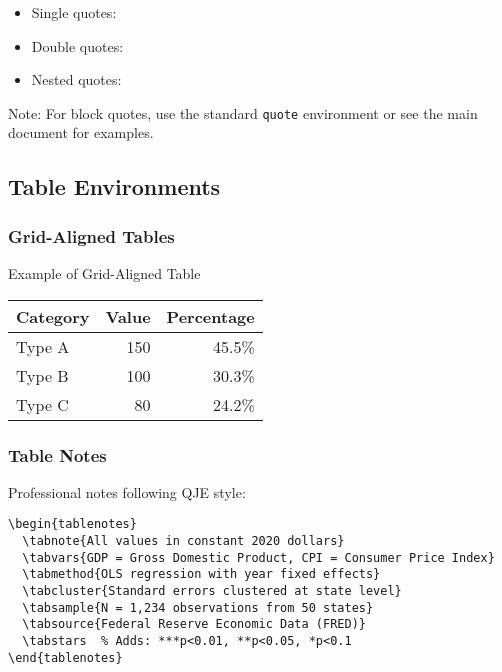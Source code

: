 \begin{itemize}
\item Single quotes: 
\item Double quotes: 
\item Nested quotes: 
\end{itemize}

Note: For block quotes, use the standard \texttt{quote} environment or see the main document for examples.

\subsection{Table Environments}

\subsubsection{Grid-Aligned Tables}

\begin{gridtable}[h]
  \caption{Example of Grid-Aligned Table}
  \centering
  \begin{tabular}{@{}lrr@{}}
    \toprule
    Category & Value & Percentage \\
    \midrule
    Type A & 150 & 45.5\% \\
    Type B & 100 & 30.3\% \\
    Type C & 80 & 24.2\% \\
    \bottomrule
  \end{tabular}
\end{gridtable}

\subsubsection{Table Notes}

Professional notes following QJE style:

\begin{verbatim}
\begin{tablenotes}
  \tabnote{All values in constant 2020 dollars}
  \tabvars{GDP = Gross Domestic Product, CPI = Consumer Price Index}
  \tabmethod{OLS regression with year fixed effects}
  \tabcluster{Standard errors clustered at state level}
  \tabsample{N = 1,234 observations from 50 states}
  \tabsource{Federal Reserve Economic Data (FRED)}
  \tabstars  % Adds: ***p<0.01, **p<0.05, *p<0.1
\end{tablenotes}
\end{verbatim}

